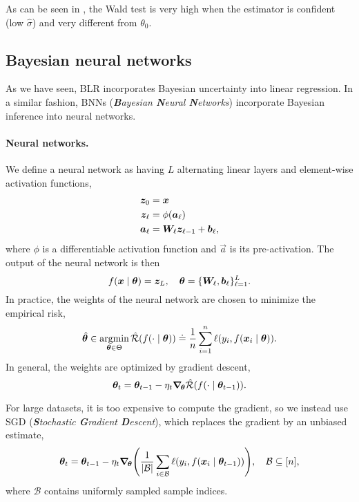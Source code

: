As can be seen in , the Wald test is very high when the estimator is confident (low
$\hat{\sigma}$) and very different from $\theta_0$.

\subsection{Bayesian neural networks}

As we have seen, BLR incorporates Bayesian uncertainty into linear regression. In a similar
fashion, BNNs (\textit{\textbf{B}ayesian \textbf{N}eural \textbf{N}etworks}) incorporate Bayesian
inference into neural networks.

\paragraph{Neural networks.}

We define a neural network as having $L$ alternating linear layers and element-wise activation
functions,
\begin{align*}
    \bm{z}_0      & = \bm{x}                                       \\
    \bm{z}_\ell   & = \phi(\bm{a}_\ell)                            \\
    \bm{a}_{\ell} & = \bm{W}_\ell \bm{z}_{\ell-1} + \bm{b}_\ell,
\end{align*}
where $\phi$ is a differentiable activation function and $\vec{a}$ is its pre-activation. The output of the neural network is then \[
    f(\bm{x} \mid \bm{\theta}) = \bm{z}_L, \quad \bm{\theta} = \{ \bm{W}_{\ell}, \bm{b}_{\ell} \}_{\ell=1}^L.
\]
In practice, the weights of the neural network are chosen to minimize the empirical risk, \[
    \hat{\bm{\theta}} \in \operatorname*{argmin}_{\bm{\theta} \in \Theta} \hat{\mathcal{R}}(f(\cdot \mid \bm{\theta})) \doteq \frac{1}{n} \sum_{i=1}^{n} \ell(y_i, f(\bm{x}_i \mid \bm{\theta})).
\]
In general, the weights are optimized by gradient descent, \[
    \bm{\theta}_t = \bm{\theta}_{t-1} - \eta_t \bm{\nabla}_{\! \bm{\theta}} \hat{\mathcal{R}}(f(\cdot \mid \bm{\theta}_{t-1})).
\]

For large datasets, it is too expensive to compute the gradient, so we instead use SGD
(\textit{\textbf{S}tochastic \textbf{G}radient \textbf{D}escent}), which replaces the gradient by
an unbiased estimate, \[
    \vec{\theta}_t = \vec{\theta}_{t-1} - \eta_t \grad{\lft( \frac{1}{|\mathcal{B}|} \sum_{i \in \mathcal{B}} \ell(y_i, f(\vec{x}_i \mid \vec{\theta}_{t-1})) \rgt)}{\vec{\theta}}, \quad \mathcal{B} \subseteq [n],
\]
where $\mathcal{B}$ contains uniformly sampled sample indices.


